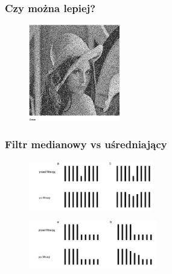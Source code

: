 \documentclass{beamer}
\begin{document}
\begin{frame}
\frametitle{Czy można lepiej?}
\begin{figure}
\hspace{-200px}
\includegraphics[width=150px]{medianowy_szum}
\end{figure}
\begin{figure}
\end{figure}
\end{frame}
\begin{frame}
\frametitle{Filtr medianowy vs uśredniający}
\begin{figure}
\includegraphics[height=80px]{median_vs_avg2}
\end{figure}
\begin{figure}
\includegraphics[height=80px]{median_vs_avg3}
\end{figure}
\end{frame}
\end{document}
